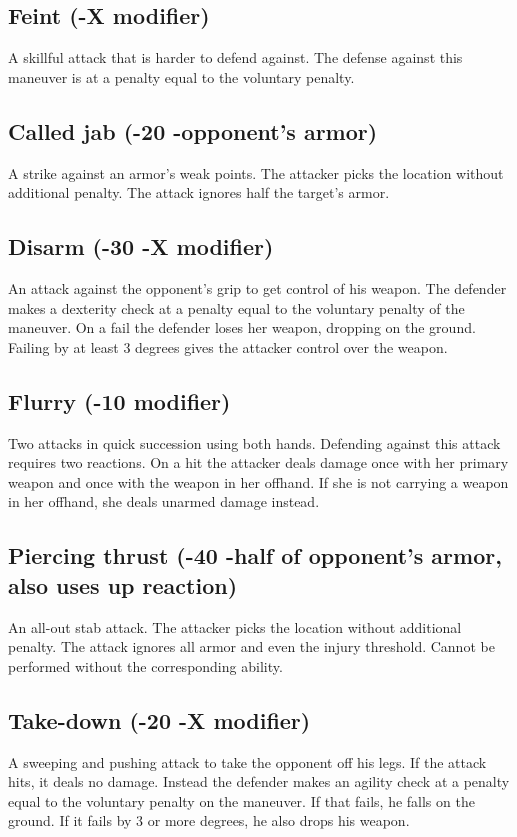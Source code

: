 \documentclass[12pt,a4paper,openany]{book}
\begin{document}
	\subsection*{Feint (-X modifier)}
	A skillful attack that is harder to defend against. The defense against this maneuver is at a penalty equal to the voluntary penalty.
	\subsection*{Called jab (-20 -opponent’s armor)}
	A strike against an armor’s weak points. The attacker picks the location without additional penalty. The attack ignores half the target’s armor.
	\subsection*{Disarm (-30 -X modifier)}
	An attack against the opponent’s grip to get control of his weapon. The defender makes a dexterity check at a penalty equal to the voluntary penalty of the maneuver. On a fail the defender loses her weapon, dropping on the ground. Failing by at least 3 degrees gives the attacker control over the weapon.
	\subsection*{Flurry (-10 modifier)}
	Two attacks in quick succession using both hands. Defending against this attack requires two reactions. On a hit the attacker deals damage once with her primary weapon and once with the weapon in her offhand. If she is not carrying a weapon in her offhand, she deals unarmed damage instead. 
	\subsection*{Piercing thrust (-40 -half of opponent’s armor, also uses up reaction)}
	An all-out stab attack. The attacker picks the location without additional penalty. The attack ignores all armor and even the injury threshold. Cannot be performed without the corresponding ability.
	\subsection*{Take-down (-20 -X modifier)}
	A sweeping and pushing attack to take the opponent off his legs. If the attack hits, it deals no damage. Instead the defender makes an agility check at a penalty equal to the voluntary penalty on the maneuver. If that fails, he falls on the ground. If it fails by 3 or more degrees, he also drops his weapon.
\end{document}
